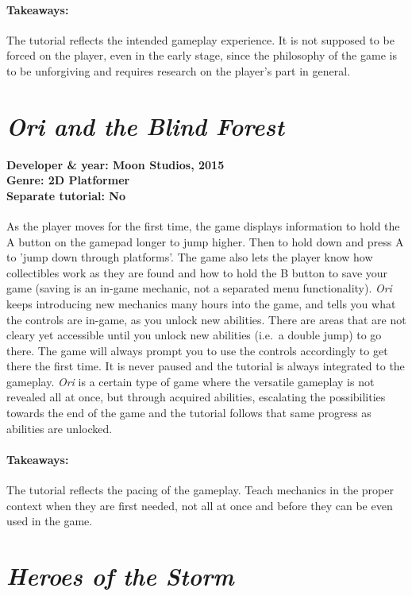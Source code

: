 \paragraph{Takeaways:}
The tutorial reflects the intended gameplay experience. It is not supposed to be forced on the player, even in the early stage, since the philosophy of the game is to be unforgiving and requires research on the player's part in general. 

\section{\textit{Ori and the Blind Forest}}
\paragraph{Developer \& year: Moon Studios, 2015 \\ Genre: 2D Platformer \\ Separate tutorial: No \\}
As the player moves for the first time, the game displays information to hold the A button on the gamepad longer to jump higher.
Then to hold down and press A to 'jump down through platforms'.
The game also lets the player know how collectibles work as they are found and how to hold the B button  to save your game (saving is an in-game mechanic, not a separated menu functionality).
\textit{Ori} keeps introducing new mechanics many hours into the game, and tells you what the controls are in-game, as you unlock new abilities.
There are areas that are not cleary yet accessible until you unlock new abilities (i.e.\ a double jump) to go there. The game will always prompt you to use the controls accordingly to get there the first time. It is never paused and the tutorial is always integrated to the gameplay.
\textit{Ori} is a certain type of game where the versatile gameplay is not revealed all at once, but through acquired abilities, escalating the possibilities towards the end of the game and the tutorial follows that same progress as abilities are unlocked.
\paragraph{Takeaways:}
The tutorial reflects the pacing of the gameplay. Teach mechanics in the proper context when they are first needed, not all at once and before they can be even used in the game.

\section{\textit{Heroes of the Storm}}
